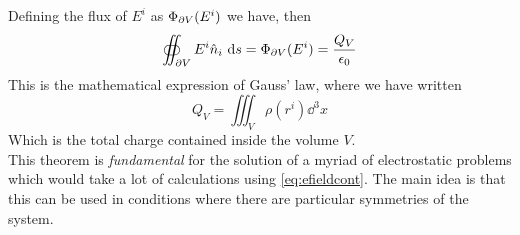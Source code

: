 \documentclass[../electromagnetism]{subfiles}
\begin{document}
Defining the flux of $E^i$ as $\Phi_{\partial V}(E^i)$ we have, then
\begin{equation}
	\oiint_{\partial V}E^i\hat{n}_i\ \mathrm{d} s=\Phi_{\partial V}(E^i)=\frac{Q_V}{\epsilon_0}
	\label{eq:gausslaw}
\end{equation}
This is the mathematical expression of Gauss' law, where we have written
\begin{equation*}
	Q_V=\iiint_V\rho(r^i)\dd^3x
\end{equation*}
Which is the total charge contained inside the volume $V$.\\
This theorem is \textit{fundamental} for the solution of a myriad of electrostatic problems which would take a lot of calculations using \eqref{eq:efieldcont}. The main idea is that this can be used in conditions where there are particular symmetries of the system.
\end{document}
